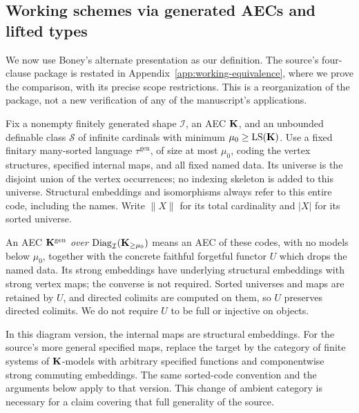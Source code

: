 \subsection{Working schemes via generated AECs and lifted types}
\label{subsec:alternate-working}
We now use Boney's alternate presentation as our definition. The source's
four-clause package is restated in Appendix~\ref{app:working-equivalence},
where we prove the comparison, with its precise scope restrictions.
This is a reorganization of the package, not a new verification of any
of the manuscript's applications.

\begin{definition}\label{def:working-coding}
Fix a nonempty finitely generated shape $\mathcal I$, an AEC $\mathbf K$, and
an unbounded definable class $\mathcal S$ of infinite cardinals with minimum
$\mu_0\geq\operatorname{LS}(\mathbf K)$. Use a fixed finitary many-sorted language
$\tau^{\mathrm{gen}}$, of size at most $\mu_0$, coding the vertex
structures, specified internal maps, and all fixed named data.
Its universe is the disjoint union of the vertex occurrences; no indexing
skeleton is added to this universe. Structural embeddings and isomorphisms
always refer to this entire code, including the names. Write $\|X\|$ for
its total cardinality and $|X|$ for its sorted universe.

An AEC $\mathbf K^{\mathrm{gen}}$ \emph{over}
$\operatorname{Diag}_{\mathcal I}(\mathbf K_{\geq\mu_0})$ means an AEC of these
codes, with no models below $\mu_0$, together with the concrete faithful
forgetful functor $U$ which drops the named data. Its strong embeddings
have underlying structural embeddings with strong vertex maps; the
converse is not required.
Sorted universes and maps are retained by $U$, and directed colimits are
computed on them, so $U$ preserves directed colimits. We do not require
$U$ to be full or injective on objects.

In this diagram version, the internal maps are structural embeddings.
For the source's more general specified maps, replace the target by the
category of finite systems of $\mathbf K$-models with arbitrary specified
functions and componentwise strong commuting embeddings. The same
sorted-code convention and the arguments below apply to that version.
This change of ambient category is necessary for a claim covering that
full generality of the source.
\end{definition}

